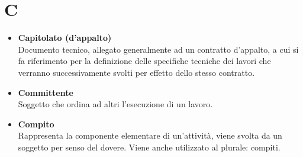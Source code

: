 \chapter{C} \label{C}
\begin{itemize}
	\item \textbf{Capitolato (d'appalto)}\\
	Documento tecnico, allegato generalmente ad un contratto d'appalto, a cui si fa riferimento per la definizione delle specifiche tecniche dei lavori che verranno successivamente svolti per effetto dello stesso contratto.

	\item \textbf{Committente}\\
	Soggetto che ordina ad altri l'esecuzione di un lavoro.
	
	\item \textbf{Compito}\\
	Rappresenta la componente elementare di un'attività, viene svolta da un soggetto per senso del dovere.
	Viene anche utilizzato al plurale: compiti.
\end{itemize}
